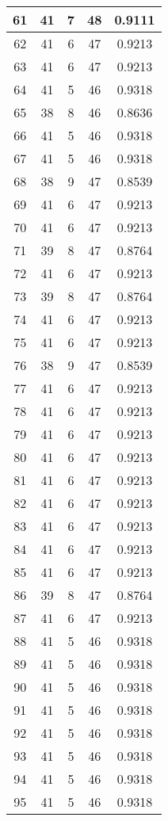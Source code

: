 \documentclass[letterpaper, 12pt]{article}
\begin{document}
\begin{longtable}{|c|c|c|c|c|}
\hline
61 & 41 & 7 & 48 & 0.9111 \\
\hline
62 & 41 & 6 & 47 & 0.9213 \\
\hline
63 & 41 & 6 & 47 & 0.9213 \\
\hline
64 & 41 & 5 & 46 & 0.9318 \\
\hline
65 & 38 & 8 & 46 & 0.8636 \\
\hline
66 & 41 & 5 & 46 & 0.9318 \\
\hline
67 & 41 & 5 & 46 & 0.9318 \\
\hline
68 & 38 & 9 & 47 & 0.8539 \\
\hline
69 & 41 & 6 & 47 & 0.9213 \\
\hline
70 & 41 & 6 & 47 & 0.9213 \\
\hline
71 & 39 & 8 & 47 & 0.8764 \\
\hline
72 & 41 & 6 & 47 & 0.9213 \\
\hline
73 & 39 & 8 & 47 & 0.8764 \\
\hline
74 & 41 & 6 & 47 & 0.9213 \\
\hline
75 & 41 & 6 & 47 & 0.9213 \\
\hline
76 & 38 & 9 & 47 & 0.8539 \\
\hline
77 & 41 & 6 & 47 & 0.9213 \\
\hline
78 & 41 & 6 & 47 & 0.9213 \\
\hline
79 & 41 & 6 & 47 & 0.9213 \\
\hline
80 & 41 & 6 & 47 & 0.9213 \\
\hline
81 & 41 & 6 & 47 & 0.9213 \\
\hline
82 & 41 & 6 & 47 & 0.9213 \\
\hline
83 & 41 & 6 & 47 & 0.9213 \\
\hline
84 & 41 & 6 & 47 & 0.9213 \\
\hline
85 & 41 & 6 & 47 & 0.9213 \\
\hline
86 & 39 & 8 & 47 & 0.8764 \\
\hline
87 & 41 & 6 & 47 & 0.9213 \\
\hline
88 & 41 & 5 & 46 & 0.9318 \\
\hline
89 & 41 & 5 & 46 & 0.9318 \\
\hline
90 & 41 & 5 & 46 & 0.9318 \\
\hline
91 & 41 & 5 & 46 & 0.9318 \\
\hline
92 & 41 & 5 & 46 & 0.9318 \\
\hline
93 & 41 & 5 & 46 & 0.9318 \\
\hline
94 & 41 & 5 & 46 & 0.9318 \\
\hline
95 & 41 & 5 & 46 & 0.9318 \\

\end{longtable}
\end{document}
